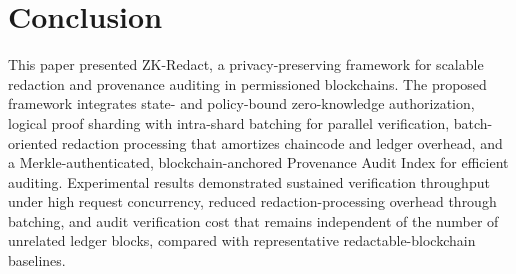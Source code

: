 \documentclass[lettersize,journal]{IEEEtran}
\begin{document}
\section{Conclusion}

This paper presented ZK-Redact, a privacy-preserving framework for scalable redaction and provenance auditing in permissioned blockchains. The proposed framework integrates state- and policy-bound zero-knowledge authorization, logical proof sharding with intra-shard batching for parallel verification, batch-oriented redaction processing that amortizes chaincode and ledger overhead,
and a Merkle-authenticated, blockchain-anchored Provenance Audit Index for efficient auditing. Experimental results demonstrated sustained verification throughput under high request concurrency, reduced redaction-processing overhead through batching, and audit verification cost that remains independent of the number of unrelated ledger blocks, compared with representative redactable-blockchain baselines. 
\end{document}
